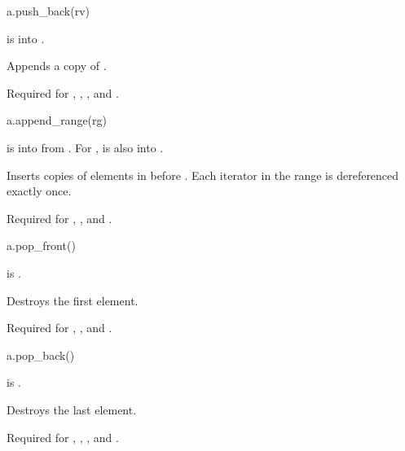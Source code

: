 \begin{itemdecl}
a.push_back(rv)
\end{itemdecl}

\begin{itemdescr}
\pnum
\result
{}

\pnum
\expects
{} is  into .

\pnum
\effects
Appends a copy of .

\pnum
\remarks
Required for
,
,
, and
.
\end{itemdescr}

\begin{itemdecl}
a.append_range(rg)
\end{itemdecl}

\begin{itemdescr}
\pnum
\result
{}

\pnum
\expects
{} is  into 
from .
For ,
 is also
 into .

\pnum
\effects
Inserts copies of elements in  before .
Each iterator in the range  is dereferenced exactly once.

\pnum
\remarks
Required for
,
, and
.
\end{itemdescr}

\begin{itemdecl}
a.pop_front()
\end{itemdecl}

\begin{itemdescr}
\pnum
\result
{}

\pnum
\expects
{} is .

\pnum
\effects
Destroys the first element.

\pnum
\remarks
Required for
,
, and
.
\end{itemdescr}

\begin{itemdecl}
a.pop_back()
\end{itemdecl}

\begin{itemdescr}
\pnum
\result
{}

\pnum
\expects
{} is .

\pnum
\effects
Destroys the last element.

\pnum
\remarks
Required for
,
,
, and
.
\end{itemdescr}

